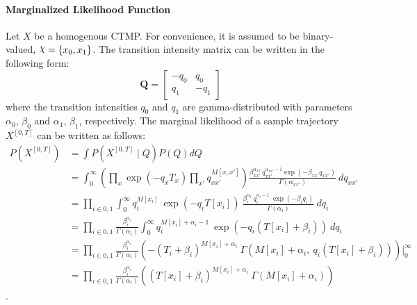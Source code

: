 {\paragraph{Marginalized Likelihood Function} 
Let $ X $ be a homogenous CTMP. For convenience, it is assumed to be binary-valued, $ \rchi = \left\lbrace x_{0}, x_{1} \right\rbrace $. The transition intensity matrix can be written in the following form:
\begin{equation}
\textbf{Q} = 
\begin{bmatrix}
-q_{0} & q_{0} \\
q_{1} & -q_{1}
\end{bmatrix}
\end{equation}
where the transition intensities $ q_{0} $ and $ q_{1} $ are gamma-distributed with parameters $ \alpha_{0}$, $ \beta_{0} $ and $ \alpha_{1} $, $ \beta_{1} $, respectively. The marginal likelihood of a sample trajectory $ X^{[0,T]} $ can be written as follows:
\begin{align}
P(X^{[0, T]}) & = \int  P(X^{[0, T]}\mid Q)P(Q) dQ \nonumber\\ & = \int_{0}^{\infty} \left( \prod_{x} \exp(-q_{x}T_{x}) \prod_{x'} q_{xx'}^{M[x, x']}\right) \frac{\beta_{xx'}^{\alpha_{xx'}}{q_{xx'}^{\alpha_{xx'}-1}}\exp(-\beta_{xx'}q_{xx'})}{\Gamma(\alpha_{xx'})} \ dq_{xx'} \nonumber\\ & = \prod_{i\in{0,1}}\int_{0}^{\infty} q_{i}^{M[x_{i}]} \ \exp(-q_{i}T[x_{i}]) \  \frac{\beta_{i}^{\alpha_{i}} \ q_{i}^{\alpha_{i}-1}\ \exp(-\beta_{i}q_{i})}{\Gamma(\alpha_{i})} \ dq_{i} \nonumber\\ & = \prod_{i\in{0,1}} \frac{\beta_{i}^{\alpha_{i}}}{\Gamma(\alpha_{i})} \int_{0}^{\infty} q_{i}^{M[x_{i}] + \alpha_{i} -1} \ \exp(-q_{i}(T[x_{i}]+\beta_{i})) \ dq_{i} \\ & = \prod_{i\in{0,1}} \frac{\beta_{i}^{\alpha_{i}}}{\Gamma(\alpha_{i})} \left( -(T_{i}+\beta_{i})^{M[x_{i}] + \alpha_{i}}\ \Gamma(M[x_{i}] + \alpha_{i}, \ q_{i}(T[x_{i}]+\beta_{i})) \right) \Big|_0^\infty  \\ & = \prod_{i\in{0,1}} \frac{\beta_{i}^{\alpha_{i}}}{\Gamma(\alpha_{i})} \left( (T[x_{i}]+\beta_{i})^{M[x_{i}] + \alpha_{i}}\ \Gamma(M[x_{i}] + \alpha_{i}) \right)
\label{eq:Marg_traj}
\end{align}.
%

}
